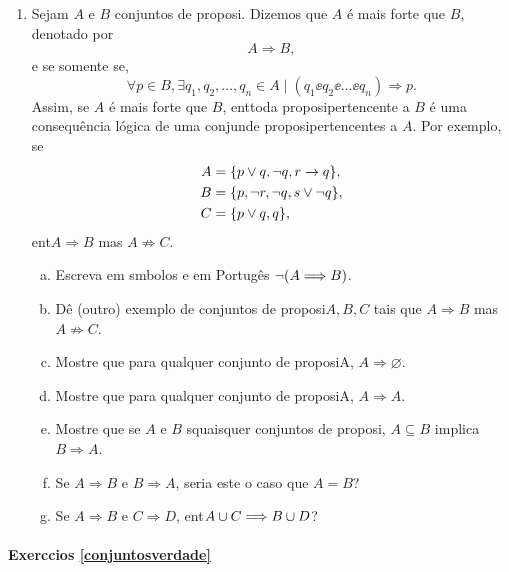 \begin{enumerate}[{\bf 1.}]
\item Sejam $A$ e $B$ conjuntos de proposi\cois. Dizemos que $A$ \'e mais forte que $B$, denotado por
\[
A\Longrightarrow B,
\]
e se somente se,
\[
\forall p\in B,\exists q_1,q_2,\ldots,q_n \in A \mid  (q_1\ee q_2\ee \ldots \ee q_n)\Rightarrow p.
\]
Assim, se $A$ \'e mais forte que $B$, ent\ao toda proposi\cao pertencente a $B$ \'e uma consequ\^encia l\'ogica de uma conjun\cao de proposi\coes pertencentes a $A$. Por exemplo, se
\begin{equation*}
 \begin{aligned}
A&=\{p\vee q, \lnot q, r\to q\},\\
B&=\{p, \lnot r, \lnot q, s\vee\lnot q\},\\
C&=\{p\vee q,q\},
 \end{aligned}
\end{equation*}
ent\ao $A\Longrightarrow B$ mas $A\not\Longrightarrow C$.
\begin{enumerate}[a)]
\item Escreva em s\ih mbolos e em Portug\^es $\lnot(A\Longrightarrow B)$.
\item D\^e (outro) exemplo de conjuntos de proposi\coes $A,B,C$ tais que $A\Longrightarrow B$ mas $A\not\Longrightarrow C$. 
\item Mostre que para qualquer conjunto de proposi\coes A, $A\Longrightarrow \varnothing$.
\item Mostre que para qualquer conjunto de proposi\coes A, $A\Longrightarrow A$.
\item Mostre que se $A$ e $B$ s\ao quaisquer conjuntos de proposi\cois, $A\subseteq B$ implica $B\Longrightarrow A$.
\item Se $A\Longrightarrow B$ e $B\Longrightarrow A$, seria este o caso que $A=B$?
\item Se $A \Longrightarrow B$ e $C\Longrightarrow D$, ent\ao $A\cup C\Longrightarrow B\cup D$?
\end{enumerate}
\end{enumerate}
\paragraph{Exerc\ih cios \ref{conjuntosverdade}}

